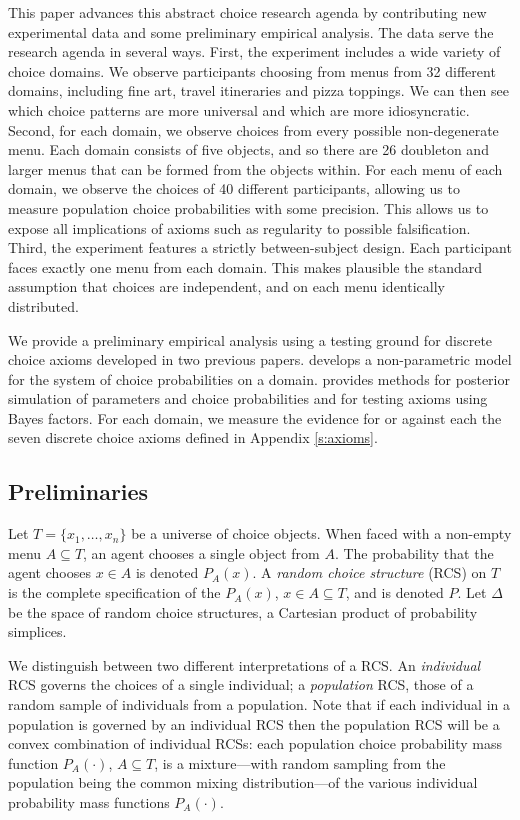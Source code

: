 \documentclass[11pt,letter]{article}
\newcommand{\menu}{menu}
\newcommand{\menus}{menus}
\begin{document}
This paper advances this abstract choice research agenda by contributing new experimental data and some preliminary empirical analysis.
The data serve the research agenda in several ways.
First, the experiment includes a wide variety of choice domains.
We observe participants choosing from \menus{} from 32 different domains, including fine art, travel itineraries and pizza toppings.
We can then see which choice patterns are more universal and which are more idiosyncratic.
Second, for each domain, we observe choices from every possible non-degenerate \menu{}.
Each domain consists of five objects, and so there are 26 doubleton and larger \menus{} that can be formed from the objects within.
For each \menu{} of each domain, we observe the choices of 40 different participants, allowing us to measure population choice probabilities with some precision.
This allows us to expose all implications of axioms such as regularity to possible falsification.
Third, the experiment features a strictly between-subject design.
Each participant faces exactly one \menu{} from each domain.
This makes plausible the standard assumption that choices are independent, and on each \menu{} identically distributed.

We provide a preliminary empirical analysis using a testing ground for discrete choice axioms developed in two previous papers.
 develops a non-parametric model for the system of choice probabilities on a domain.
 provides methods for posterior simulation of parameters and choice probabilities and for testing axioms using Bayes factors.
For each domain, we measure the evidence for or against each the seven discrete choice axioms defined in Appendix \ref{s:axioms}.

\subsection{Preliminaries}

Let $T = \{x_1,\ldots,x_n\}$ be a universe of choice objects.
When faced with a non-empty \menu{} $A \subseteq T$, an agent chooses a single object from $A$.
The probability that the agent chooses $x \in A$ is denoted $P_A(x)$.
A {\em random choice structure} (RCS) on $T$ is the complete specification of the $P_A(x)$, $x \in A \subseteq T$, and is denoted $P$.
Let $\Delta$ be the space of random choice structures, a Cartesian product of probability simplices.

We distinguish between two different interpretations of a RCS.
An {\em individual} RCS governs the choices of a single individual; a {\em population} RCS, those of a random sample of individuals from a population.
Note that if each individual in a population is governed by an individual RCS then the population RCS will be a convex combination of individual RCSs: each population choice probability mass function $P_A(\cdot)$, $A \subseteq T$, is a mixture---with random sampling from the population being the common mixing distribution---of the various individual probability mass functions $P_A(\cdot)$.
\end{document}

